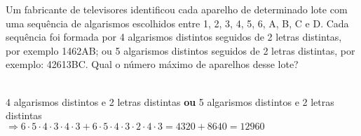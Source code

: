 \begin{ex}
Um fabricante de televisores identificou cada aparelho de determinado lote com uma sequência de algarismos escolhidos entre 1, 2, 3, 4, 5, 6, A, B, C e D. Cada sequência foi formada por 4 algarismos distintos seguidos de 2 letras distintas, por exemplo 1462AB; ou 5 algarismos distintos seguidos de 2 letras distintas, por exemplo: 42613BC. Qual o número máximo de aparelhos desse lote?
  \begin{sol}
   \phantom{A} \\
   4 algarismos distintos e 2 letras distintas \textbf{ou} 5 algarismos distintos e 2 letras distintas\\
   $\Longrightarrow 6\cdot5\cdot4\cdot3\cdot4\cdot3 + 6\cdot5\cdot4\cdot3\cdot2\cdot4\cdot3=4320+8640=12960$
  \end{sol}
\end{ex}